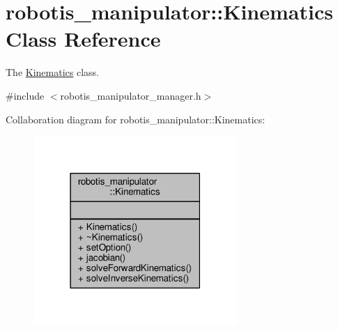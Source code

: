\hypertarget{classrobotis__manipulator_1_1_kinematics}{}\section{robotis\+\_\+manipulator\+:\+:Kinematics Class Reference}
\label{classrobotis__manipulator_1_1_kinematics}


The \hyperlink{classrobotis__manipulator_1_1_kinematics}{Kinematics} class.  




{\ttfamily \#include $<$robotis\+\_\+manipulator\+\_\+manager.\+h$>$}



Collaboration diagram for robotis\+\_\+manipulator\+:\+:Kinematics\+:\nopagebreak
\begin{figure}[H]
\begin{center}
\leavevmode
\includegraphics[width=219pt]{classrobotis__manipulator_1_1_kinematics__coll__graph}
\end{center}
\end{figure}
